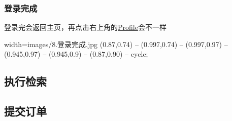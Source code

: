 \begin{frame}
    \frametitle{登录完成}
    登录完会返回主页，再点击右上角的\uline{Profile}会不一样
 \begin{annotationimage}{width=\linewidth}{images/8.登录完成.jpg}
     (0.87,0.74) -- (0.997,0.74) -- (0.997,0.97) --(0.945,0.97) -- (0.945,0.9) -- (0.87,0.90) -- cycle;
\end{annotationimage}
\end{frame}
\subsection{执行检索}
\subsection{提交订单}